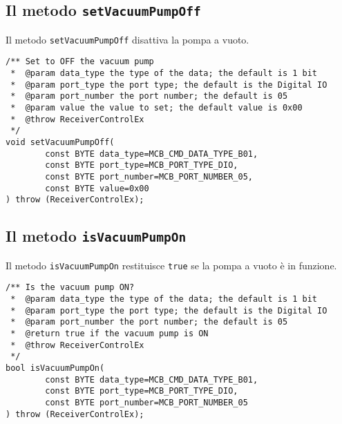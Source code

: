 \subsection{Il metodo \texttt{setVacuumPumpOff}}
Il metodo \texttt{setVacuumPumpOff} disattiva la pompa a vuoto.
\lstset{language=C++}
\begin{lstlisting}[caption={Dichiarazione del metodo \texttt{setVacuumPumpOff}},
label=lst:setVacuumPumpOff,mathescape]
/** Set to OFF the vacuum pump
 *  @param data_type the type of the data; the default is 1 bit
 *  @param port_type the port type; the default is the Digital IO
 *  @param port_number the port number; the default is 05
 *  @param value the value to set; the default value is 0x00
 *  @throw ReceiverControlEx
 */
void setVacuumPumpOff(
        const BYTE data_type=MCB_CMD_DATA_TYPE_B01,
        const BYTE port_type=MCB_PORT_TYPE_DIO,
        const BYTE port_number=MCB_PORT_NUMBER_05,
        const BYTE value=0x00
) throw (ReceiverControlEx);
\end{lstlisting}
\lstset{numbers=none}


\subsection{Il metodo \texttt{isVacuumPumpOn}}
Il metodo \texttt{isVacuumPumpOn} restituisce \texttt{true} se la pompa a vuoto \`e in funzione.
\lstset{language=C++}
\begin{lstlisting}[caption={Dichiarazione del metodo \texttt{isVacuumPumpOn}},
label=lst:isVacuumPumpOn,mathescape]
/** Is the vacuum pump ON?
 *  @param data_type the type of the data; the default is 1 bit
 *  @param port_type the port type; the default is the Digital IO
 *  @param port_number the port number; the default is 05
 *  @return true if the vacuum pump is ON
 *  @throw ReceiverControlEx
 */
bool isVacuumPumpOn(
        const BYTE data_type=MCB_CMD_DATA_TYPE_B01,
        const BYTE port_type=MCB_PORT_TYPE_DIO,
        const BYTE port_number=MCB_PORT_NUMBER_05
) throw (ReceiverControlEx);
\end{lstlisting}
\lstset{numbers=none}


